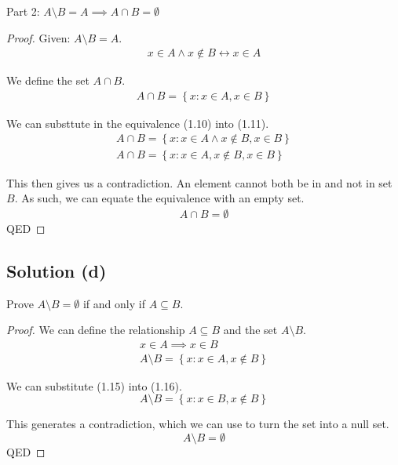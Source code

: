 \documentclass[12pt]{report}
\begin{document}
Part 2: $A \setminus B = A \implies A \cap B = \emptyset$
\begin{proof}
    Given: $A \setminus B = A$.
    \begin{gather}
        x \in A \land x \notin B \leftrightarrow x \in A
    \end{gather}
    
    We define the set $A \cap B$.
    \begin{gather}
        A \cap B = \left\{x: x \in A, x \in B\right\}
    \end{gather}

    We can substtute in the equivalence (1.10) into (1.11).
    \begin{gather}
        A \cap B = \left\{x: x \in A \land x \notin B, x \in B\right\}\\
        A \cap B = \left\{x: x \in A, x \notin B, x \in B\right\}
    \end{gather}

    This then gives us a contradiction. An element cannot both be in and not in set $B$. 
    As such, we can equate the equivalence with an empty set.
    \begin{gather}
        A \cap B = \emptyset
    \end{gather}
    QED
\end{proof}

\subsection{Solution (d)}
Prove $A \setminus B = \emptyset$ if and only if $A \subseteq B$.
\begin{proof}
    We can define the relationship $A \subseteq B$ and the set $A \setminus B$.
    \begin{gather}
        x \in A \implies x \in B\\
        A \setminus B = \left\{x:x \in A, x \notin B\right\}
    \end{gather}

    We can substitute (1.15) into (1.16).
    \begin{equation}
        A \setminus B = \left\{x: x \in B, x \notin B\right\}
    \end{equation}

    This generates a contradiction, which we can use to turn the set into a null set.
    \begin{equation}
        A \setminus B = \emptyset
    \end{equation}
    QED
\end{proof}
\end{document}

